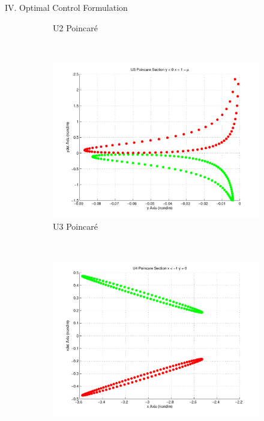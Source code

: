 \documentclass[final, usenames, dvipsnames]{beamer}
\newlength{\twocolwidth}
\begin{document}
\begin{frame}[t]
\begin{columns}[T,onlytextwidth]
\begin{column}{\twocolwidth}
\begin{block}{IV. Optimal Control Formulation}
\begin{itemize}
\begin{figure}
\begin{subfigure}[b]{0.24\columnwidth}
                \caption*{U2 Poincar\'e}
                \label{fig:u2_manifolds}
        	\end{subfigure}%
        	~%
        	\begin{subfigure}[b]{0.24\columnwidth}
                \includegraphics[width=\columnwidth]{U3_poincare}
                \caption*{U3 Poincar\'e}
                \label{fig:u3_poincare}
        	\end{subfigure}%
        	~%
        	\begin{subfigure}[b]{0.24\columnwidth}
                \includegraphics[width=\columnwidth]{U4_poincare}

\end{subfigure}
\end{figure}
\end{itemize}
\end{block}
\end{column}
\end{columns}
\end{frame}
\end{document}
